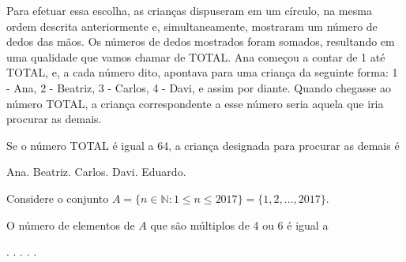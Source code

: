 \documentclass[a4paper, 12pt]{exam}
\begin{document}
\begin{questions}
            Para efetuar essa escolha, as crianças dispuseram em um círculo, na mesma ordem descrita anteriormente e, simultaneamente, mostraram um número de dedos das mãos. Os números de dedos mostrados foram somados, resultando em uma qualidade que vamos chamar de TOTAL. Ana começou a contar de 1 até  TOTAL, e, a cada número dito, apontava para uma criança da seguinte forma: 1 - Ana, 2 - Beatriz, 3 - Carlos, 4 - Davi, e assim por diante. Quando chegasse ao número TOTAL, a criança correspondente a esse número seria aquela que iria procurar as demais.

            Se o número TOTAL é igual a 64, a criança designada para procurar as demais é

            \begin{choices}
                \choice Ana.
                \choice Beatriz.
                \choice Carlos.
                \choice Davi.
                \choice Eduardo.
            \end{choices}
        \question
            Considere o conjunto $ A=\{n\in\mathbb{N}:1 \leqslant n \leqslant 2017\}=\{1,2,\ldots, 2017\}$.

            O número de elementos de $A$ que são múltiplos de 4 ou 6 é igual a 
                \begin{choices}
                    .
                    .
                    .
                    .
                    .
                \end{choices}
    \end{questions}
\end{document}
